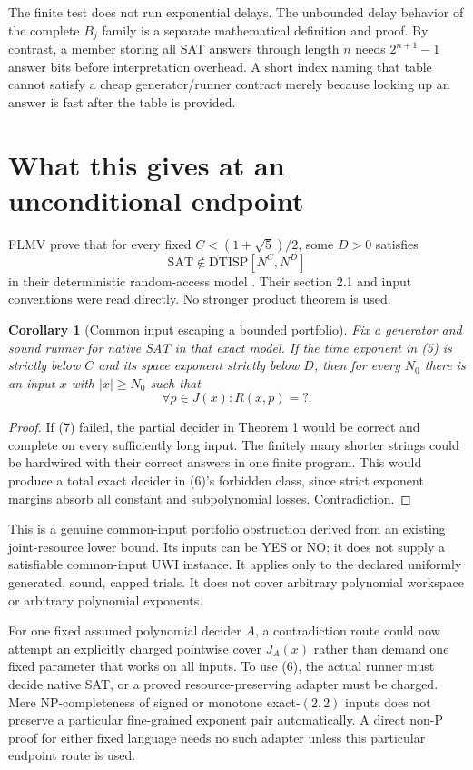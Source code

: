 \documentclass[11pt]{article}
\newtheorem{corollary}[theorem]{Corollary}
\begin{document}
The finite test does not run exponential delays. The unbounded delay behavior
of the complete $B_j$ family is a separate mathematical definition and proof.
By contrast, a member storing all SAT answers through length $n$ needs
$2^{n+1}-1$ answer bits before interpretation overhead. A short index naming
that table cannot satisfy a cheap generator/runner contract merely because
looking up an answer is fast after the table is provided.

\section{What this gives at an unconditional endpoint}
FLMV prove that for every fixed $C<(1+\sqrt5)/2$, some $D>0$ satisfies
\[
 \mathrm{SAT}\notin\mathrm{DTISP}[N^C,N^D]               \tag{6}
\]
in their deterministic random-access model \cite{flmv}. Their section 2.1
and input conventions were read directly. No stronger product theorem is used.

\begin{corollary}[Common input escaping a bounded portfolio]\label{cor:failure}
Fix a generator and sound runner for native SAT in that exact model. If the
time exponent in (5) is strictly below $C$ and its space exponent strictly
below $D$, then for every $N_0$ there is an input $x$ with $|x|\ge N_0$ such that
\[
                   \forall p\in J(x):R(x,p)=?.         \tag{7}
\]
\end{corollary}
\begin{proof}
If (7) failed, the partial decider in Theorem 1 would be correct and complete
on every sufficiently long input. The finitely many shorter strings could
be hardwired with their correct answers in one finite program. This would
produce a total exact decider in (6)'s forbidden class, since strict exponent
margins absorb all constant and subpolynomial losses. Contradiction.
\end{proof}
This is a genuine common-input portfolio obstruction derived from an existing
joint-resource lower bound. Its inputs can be YES or NO; it does not supply
a satisfiable common-input UWI instance. It applies only to the declared
uniformly generated, sound, capped trials. It does not cover arbitrary
polynomial workspace or arbitrary polynomial exponents.

For one fixed assumed polynomial decider $A$, a contradiction route could
now attempt an explicitly charged pointwise cover $J_A(x)$ rather than demand
one fixed parameter that works on all inputs. To use (6), the actual runner
must decide native SAT, or a proved resource-preserving adapter must be
charged. Mere NP-completeness of signed or monotone exact-$(2,2)$ inputs does
not preserve a particular fine-grained exponent pair automatically. A direct
non-P proof for either fixed language needs no such adapter unless this
particular endpoint route is used.
\end{document}
